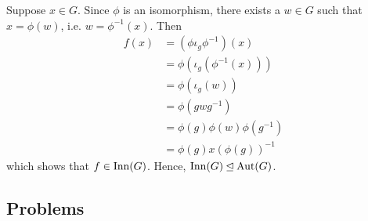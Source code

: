 \begin{questions}
    Suppose $x \in G$. Since $\phi$ is an isomorphism, there exists a $w \in G$ such that $x = \phi(w)$, i.e. $w = \phi^{-1}(x)$. Then
    \begin{align*}
        f(x) &= \left(\phi\iota_g\phi^{-1}\right)(x)\\
        &= \phi(\iota_g(\phi^{-1}(x)))\\
        &= \phi(\iota_g(w))\\
        &= \phi(gwg^{-1})\\
        &= \phi(g)\phi(w)\phi(g^{-1})\\
        &= \phi(g)x\left(\phi(g)\right)^{-1}
    \end{align*}
    which shows that $f \in \mathrm{Inn}(G)$. Hence, $\mathrm{Inn}(G) \unlhd \mathrm{Aut}(G)$.
\end{questions}

\subsection*{Problems}
